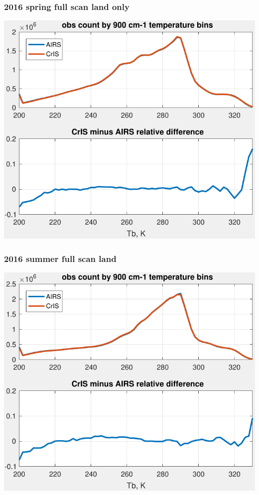 \documentclass[11pt]{beamer}
\begin{document}
\begin{frame}
\frametitle{2016 spring full scan land only}
\begin{center}
  \includegraphics[scale=0.7]{figures/full-scan_land_2016_spring.pdf}
\end{center}
\end{frame} %
\begin{frame}
\frametitle{2016 summer full scan land}
\begin{center}
  \includegraphics[scale=0.7]{figures/full-scan_land_2016_summer.pdf}
\end{center}
\end{frame} %
\end{document}
